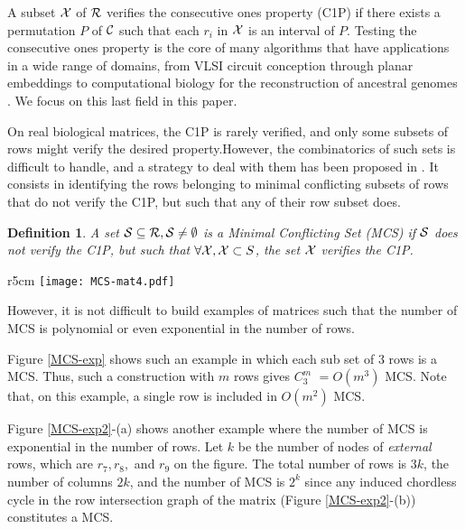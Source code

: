 \documentclass{article}
\newtheorem{definition}{Definition}
\begin{document}
A subset ${\cal X}$ of ${\cal R}$ verifies the consecutive ones
property (C1P) if there exists a permutation $P$ of ${\cal C}$ such
that each $r_i$ in ${\cal X}$ is an interval of $P$. Testing the
consecutive ones property is the core of many algorithms that have
applications in a wide range of domains, from VLSI circuit conception
through planar embeddings \cite{nr-pgd-04} to computational biology
for the reconstruction of ancestral genomes
\cite{BBCC2004,Stephane2010,CHSY2009,Chauve08,SW2009}. 
We focus on this last field in this paper.



On real biological matrices, the C1P is rarely verified, and only some
subsets of rows might verify the desired property.However, the combinatorics of such sets is difficult to
handle, and a strategy to deal with them has been proposed
in \cite{BBCC2004,Chauve08,SW2009}. It consists in identifying
the rows belonging to minimal conflicting subsets of rows that 
do not verify the C1P, but such that any of their
row subset does. 

\begin{definition}
A set ${\cal S} \subseteq {\cal R}, {\cal S} \neq \emptyset$ is a {\em Minimal
  Conflicting Set} (MCS) if ${\cal S}$ does not verify the C1P, but such 
that $\forall {\cal X},{\cal X} \subset S$, the set ${\cal X}$ verifies the C1P.
\end{definition}






\begin{wrapfigure}[15]{r}{5cm}
  \centering
\texttt{[image: MCS-mat4.pdf]}
\caption{A matrix not verifying the C1P and such
  that each set of 3 rows is a MCS.}
 \label{MCS-exp}
\end{wrapfigure}

\noindent
However, it is not difficult to build examples of  matrices such that the
number of MCS is polynomial or even exponential in the number of
rows.

 Figure \ref{MCS-exp} shows such an example in which each sub set of
$3$ rows is a MCS. Thus, such a construction with $m$ rows
gives $C^m_3$ $= O(m^3)$ MCS. Note that, on this example, a single
row is included in $O(m^2)$ MCS.



 Figure \ref{MCS-exp2}-(a) shows another example where the number of MCS
 is exponential in the number of rows. Let $k$ be the number of nodes
 of {\em external} rows, which are $r_7,r_8,$ and $r_9$ on the
 figure. The total number of rows is $3k$, the number of columns $2k$,
 and the number of MCS is $2^k$ since any induced chordless cycle in
 the row intersection graph of the matrix  (Figure \ref{MCS-exp2}-(b)) 
constitutes a MCS.
\end{document}
